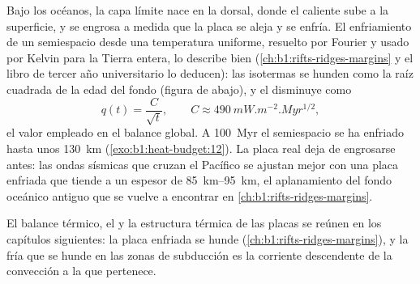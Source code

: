 Bajo los océanos, la capa límite nace en la dorsal, donde el  caliente sube a la superficie, y se engrosa a medida que la placa
se aleja y se enfría. El enfriamiento de un semiespacio desde una temperatura uniforme, resuelto por Fourier y usado por Kelvin para
la Tierra entera, lo describe bien (\cref{ch:b1:rifts-ridges-margins} y el libro de tercer año universitario lo deducen): las
isotermas se hunden como la raíz cuadrada de la edad del fondo (figura de abajo), y el  disminuye como
\[
  q(t) = \frac{C}{\sqrt t}, \qquad C \approx \qty{490}{mW.m^{-2}.Myr^{1/2}},
\]
el valor empleado en el balance global. %
A \qty{100}{Myr} el semiespacio se ha enfriado hasta unos \qty{130}{km} (\cref{exo:b1:heat-budget:12}). La placa real deja de
engrosarse antes: las ondas sísmicas que cruzan el Pacífico se ajustan mejor con una placa enfriada que tiende a un espesor de
\qtyrange{85}{95}{km}, el aplanamiento del fondo oceánico antiguo que se vuelve a encontrar en \cref{ch:b1:rifts-ridges-margins}.

El balance térmico, el  y la estructura térmica de las placas se reúnen en los capítulos siguientes: la placa enfriada
se hunde (\cref{ch:b1:rifts-ridges-margins}), y la  fría que se hunde en las zonas de subducción es la corriente
descendente de la convección a la que pertenece.

